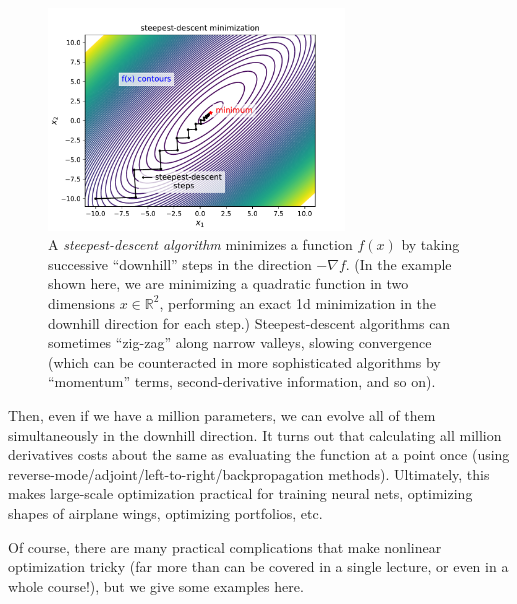 \begin{figure}
    \centering
    \includegraphics[width=0.7\textwidth]{figures/steepest-descent}
    \caption{    
    A \emph{steepest-descent algorithm} minimizes a function $f(x)$ by taking successive ``downhill'' steps in the direction $-\nabla f$.  (In the example shown here, we are minimizing a quadratic function in two dimensions $x \in \mathbb{R}^2$, performing an exact 1d minimization in the downhill direction for each step.)  Steepest-descent algorithms can sometimes ``zig-zag'' along narrow valleys, slowing convergence (which can be counteracted in more sophisticated algorithms by ``momentum'' terms, second-derivative information, and so on).}
    \label{fig:steepest-descent}
\end{figure}

Then, even if we have a million parameters, we can evolve all of them simultaneously in the downhill direction. It turns out that calculating all million derivatives costs about the same as evaluating the function at a point once (using reverse-mode/adjoint/left-to-right/backpropagation methods). Ultimately, this makes large-scale optimization practical for training neural nets, optimizing shapes of airplane wings, optimizing portfolios, etc.

Of course, there are many practical complications that make nonlinear optimization tricky (far more than can be covered in a single lecture, or even in a whole course!), but we give some examples here.


